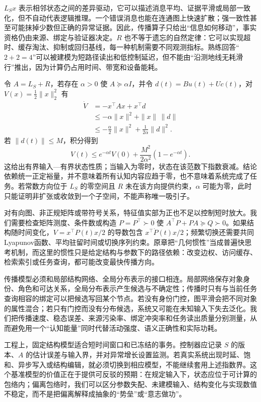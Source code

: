 $L_Sx$ 表示相邻状态之间的差异驱动，它可以描述消息平均、证据平滑或局部一致化，但不自动代表逻辑推理。一个错误消息也能在连通图上快速扩散；强一致性甚至可能抹掉少数但正确的异常证据。因此，传播算子只给出“信息如何移动”，事实资格仍由来源、绑定与验证器决定。$R$ 也不等于遗忘的自然定律：它可以实现超时、缓存淘汰、抑制或回归基线，每一种机制需要不同观测指标。熟练回答“$2+2=4$”可以被建模为短路径读出和低控制延迟，但不能由“沿测地线无耗滑行”推出，因为计算仍占用时间、带宽和设备能耗。

令 $A=L_S+R$，若存在 $\alpha>0$ 使 $A\succeq\alpha I$，并令 $d(t)=Bu(t)+Uc(t)$，对 $V(x)=\frac12\|x\|_2^2$ 有
\begin{align}
 \dot V&=-x^\top A x+x^\top d\\
 &\le-\alpha\|x\|^2+\|x\|\,\|d\|\\
 &\le-\frac{\alpha}{2}\|x\|^2+\frac{1}{2\alpha}\|d\|^2.
\end{align}
若 $\|d(t)\|\le M$，积分得到
\begin{equation}
 V(t)\le e^{-\alpha t}V(0)+\frac{M^2}{2\alpha^2}\left(1-e^{-\alpha t}\right).
\end{equation}
这给出有界输入—有界状态性质；当输入为零时，状态在该范数下指数衰减。结论依赖统一正定裕量，并不意味着所有认知内容应趋于零，也不意味着系统完成了任务。若常数方向位于 $L_S$ 的零空间且 $R$ 未在该方向提供约束，$\alpha$ 可能为零，此时只能证明非扩张或收敛到一个子空间，不能声称唯一吸引子。

对有向图、非正规矩阵或带符号关系，特征值实部为正也不足以控制短时放大。我们需要检查矩阵测度、条件数或构造 $P=P^\top\succ0$ 使 $A^\top P+PA\succeq Q\succ0$。如果结构随时间变化，$V=x^\top P(t)x/2$ 的导数包含 $x^\top\dot P(t)x/2$；频繁切换还需要共同Lyapunov函数、平均驻留时间或切换序列约束。原章把“几何惯性”当成普遍快思考机制，而这里的惯性只是给定结构与参数下的路径依赖：改变边权、访问缓存、检索索引或任务查询，都可能改变最快传播方向。

传播模型必须和局部结构网络、全局分布表示的接口相连。局部网络保存对象身份、角色和可达关系，全局分布表示产生候选与不确定性；传播时只有与当前任务查询相容的绑定可以把候选写回某个节点。若没有身份门控，图平滑会把不同对象的属性混合；若只有门控而没有分布候选，系统又可能在未知输入下失去泛化。我们把传播速度、稳态误差、来源污染率、绑定冲突率和任务读出质量分别测量，从而避免用一个“认知能量”同时代替活动强度、语义正确性和实际功耗。

工程上，固定结构模型适合短时间窗口和已冻结的事务。控制器应记录 $S$ 的版本、$A$ 的估计误差与输入界，并对异常增长设置监测。若真实系统出现时延、饱和、异步写入或结构编辑，就必须切换到相应模型，不能继续套用上述指数界。这个基准模型的价值正在于提供可反驳的预期：在规定输入下，状态应位于可计算的包络内；偏离包络时，我们可以区分参数失配、未建模输入、结构变化与实现数值不稳定，而不是把偏离解释成抽象的“势垒”或“意志做功”。

